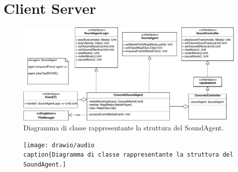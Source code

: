 \section{Client Server}
\label{sec:client_server_design}

\begin{figure}[H]
	\centering
	\includegraphics[width=0.99\columnwidth]{drawio/audioAgent/audioAgent.pdf}
	\caption{Diagramma di classe rappresentante la struttura del SoundAgent.}
	\label{fig:AudioAgent}
\end{figure}


\begin{figure}[H]
	\centering
	\texttt{[image: drawio/audio
	\\caption\{Diagramma di classe rappresentante la struttura del SoundAgent.]}
	\label{fig:AudioAgent}
\end{figure}